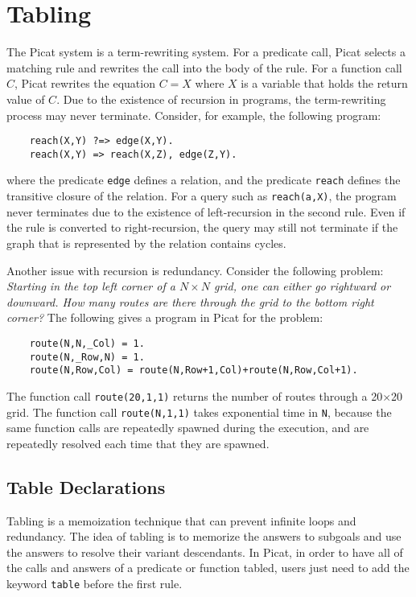 \chapter{\label{chapter:tabling}Tabling}
The Picat system is a term-rewriting system. For a predicate call, Picat selects a matching rule and rewrites the call into the body of the rule. For a function call $C$, Picat rewrites the equation $C = X$ where $X$ is a variable that holds the return value of $C$. Due to the existence of recursion in programs, the term-rewriting process may never terminate. Consider, for example, the following program:  
\begin{verbatim}
    reach(X,Y) ?=> edge(X,Y).
    reach(X,Y) => reach(X,Z), edge(Z,Y).
\end{verbatim}
where the predicate \texttt{edge} defines a relation, and the predicate \texttt{reach} defines the transitive closure of the relation. For a query such as \texttt{reach(a,X)}, the program never terminates due to the existence of left-recursion in the second rule. Even if the rule is converted to right-recursion, the query may still not terminate if the graph that is represented by the relation contains cycles. 

Another issue with recursion is redundancy. Consider the following problem: \emph{Starting in the top left corner of a $N\times N$ grid, one can either go rightward or downward. How many routes are there through the grid to the bottom right corner?} The following gives a program in Picat for the problem:
\begin{verbatim}
    route(N,N,_Col) = 1.
    route(N,_Row,N) = 1.
    route(N,Row,Col) = route(N,Row+1,Col)+route(N,Row,Col+1).
\end{verbatim}
The function call \texttt{route(20,1,1)} returns the number of routes through a 20$\times$20 grid. The function call \texttt{route(N,1,1)} takes exponential time in \texttt{N}, because the same function calls are repeatedly spawned during the execution, and are repeatedly resolved each time that they are spawned.

\section{Table Declarations}
Tabling is a memoization technique that can prevent infinite loops and redundancy. The idea of tabling is to memorize the answers to subgoals and use the answers to resolve their variant descendants. In Picat, in order to have all of the calls and answers of a predicate or function tabled, users just need to add the keyword \texttt{table} before the first rule.

